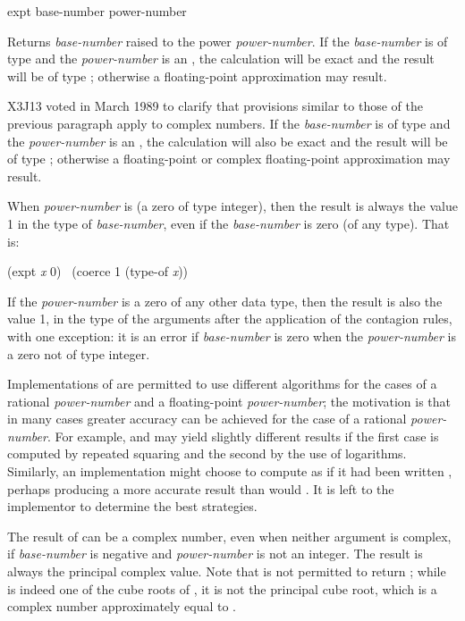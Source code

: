 \begin{defun}[Function]
expt base-number power-number

Returns \emph{base-number} raised to the power \emph{power-number}.
If the \emph{base-number} is of type  and the \emph{power-number} is
an ,
the calculation will be exact and the result will be of type ;
otherwise a floating-point approximation may result.

\begin{newer}
X3J13 voted in March 1989
to clarify that provisions similar to those of the previous paragraph apply to complex
numbers.  If the \emph{base-number} is of type 
and the \emph{power-number} is
an ,
the calculation will also be exact and the result will be of type
;
otherwise a floating-point or complex floating-point approximation may result.
\end{newer}

When \emph{power-number} is  (a zero of type integer),
then the result is always the value 1 in the type of \emph{base-number},
even if the \emph{base-number} is zero (of any type).  That is:
\begin{lisp}
(expt \emph{x} 0) \EQ\ (coerce 1 (type-of \emph{x}))
\end{lisp}
If the \emph{power-number} is a zero of any other data type,
then the result is also the value 1, in the type of the arguments
after the application of the contagion rules, with one exception:
it is an error if \emph{base-number} is zero when the \emph{power-number}
is a zero not of type integer.

Implementations of  are permitted to use different algorithms
for the cases of a rational \emph{power-number} and a floating-point
\emph{power-number}; the motivation is that in many cases greater accuracy
can be achieved for the case of a rational \emph{power-number}.
For example,  and  may yield
slightly different results if the first case is computed by repeated squaring
and the second by the use of logarithms.  Similarly, an implementation
might choose to compute  as if it had
been written , perhaps producing a more accurate
result than would .  It is left to the implementor
to determine the best strategies.

The result of  can be a complex number, even when neither argument
is complex, if \emph{base-number} is negative and \emph{power-number}
is not an integer.  The result is always the principal complex value.
Note that  is not permitted to return ;
while  is indeed one of the cube roots of , it is
not the principal cube root, which is a complex number
approximately equal to .
\end{defun}

